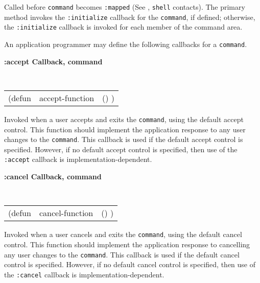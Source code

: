 \begin{flushright} \parbox[t]{6.125in}{ Called before {\tt command} becomes
{\tt :mapped} (See \cite{clue}, {\tt shell} contacts).  The primary
method
invokes the {\tt :initialize} callback for the {\tt command}, if defined;
otherwise, the {\tt :initialize} callback is invoked for each member of the
command area.  }\end{flushright}



An application programmer may define the following callbacks for
a {\tt command}.

{\samepage
{\large {\bf :accept \hfill Callback, command}} 
\begin{flushright} 
\parbox[t]{6.125in}{
\tt
\begin{tabular}{lll}
\raggedright
(defun & accept-function & () )
\end{tabular}
\rm

}\end{flushright}}

\begin{flushright} \parbox[t]{6.125in}{
Invoked when a user accepts and exits the {\tt command}, using the default
accept control. 
This function should implement the application response to any user changes to
the {\tt command}.
This callback is used if the default accept control is specified. However, if no
default accept control is specified, then use of the {\tt :accept} callback is
implementation-dependent.
  }\end{flushright}

{\samepage
{\large {\bf :cancel \hfill Callback, command}} 
\begin{flushright} 
\parbox[t]{6.125in}{
\tt
\begin{tabular}{lll}
\raggedright
(defun & cancel-function & () )
\end{tabular}
\rm

}\end{flushright}}

\begin{flushright} \parbox[t]{6.125in}{
Invoked when a user cancels and exits the {\tt command}, using the default
cancel control. 
This function should implement the application response to cancelling any user
changes to the {\tt command}. This callback is used if the default cancel control
is specified. However, if no
default cancel control is specified, then use of the {\tt :cancel} callback is
implementation-dependent.


}\end{flushright}

